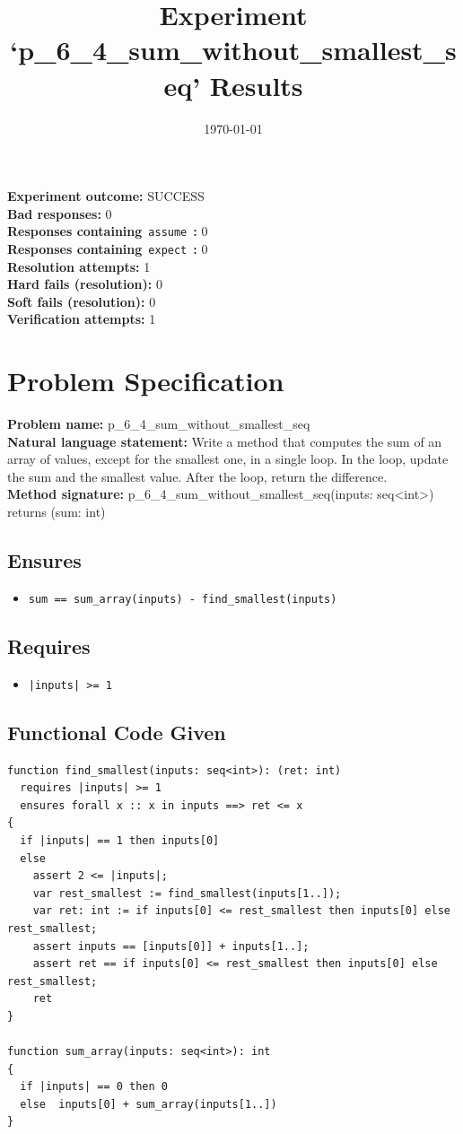 \documentclass{article}
\begin{document}
\title{Experiment `p\_6\_4\_sum\_without\_smallest\_seq' Results}
\author{\today}
\date{}
\maketitle
\textbf{Experiment outcome: }SUCCESS
\\\textbf{Bad responses: }0
\\\textbf{Responses containing}~\texttt{assume}~\textbf{: }0
\\\textbf{Responses containing}~\texttt{expect}~\textbf{: }0
\\\textbf{Resolution attempts: }1
\\\textbf{Hard fails (resolution): }0
\\\textbf{Soft fails (resolution): }0
\\\textbf{Verification attempts: }1
\section*{Problem Specification}
\textbf{Problem name: }p\_6\_4\_sum\_without\_smallest\_seq
\\\textbf{Natural language statement: }Write a method that computes the sum of an array of values, except for the smallest one, in a single loop. In the loop, update the sum and the smallest value. After the loop, return the difference.
\\\textbf{Method signature: }p\_6\_4\_sum\_without\_smallest\_seq(inputs: seq<int>) returns (sum: int)
\subsection*{Ensures}
\begin{itemize}
\item \texttt{sum == sum\_array(inputs) - find\_smallest(inputs)}
\end{itemize}
\subsection*{Requires}
\begin{itemize}
\item \texttt{|inputs| >= 1}
\end{itemize}
\subsection*{Functional Code Given}
\begin{lstlisting}
function find_smallest(inputs: seq<int>): (ret: int)
  requires |inputs| >= 1
  ensures forall x :: x in inputs ==> ret <= x 
{
  if |inputs| == 1 then inputs[0]
  else 
    assert 2 <= |inputs|;
    var rest_smallest := find_smallest(inputs[1..]);
    var ret: int := if inputs[0] <= rest_smallest then inputs[0] else rest_smallest;
    assert inputs == [inputs[0]] + inputs[1..]; 
    assert ret == if inputs[0] <= rest_smallest then inputs[0] else rest_smallest;
    ret 
}

function sum_array(inputs: seq<int>): int
{
  if |inputs| == 0 then 0
  else  inputs[0] + sum_array(inputs[1..])
}
\end{lstlisting}
\clearpage
\end{document}
